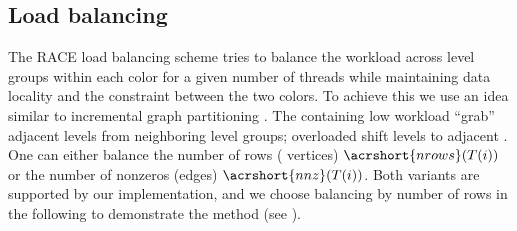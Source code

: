 \subsection{Load balancing}\label{subsec:LB} 
The RACE load balancing scheme tries to balance the workload across level
groups within each color for a given number of threads while maintaining data
locality and the \DK constraint between the two colors. To achieve this we use
an idea similar to incremental graph partitioning \cite{load_balancing}.  The
\levelGroups containing low workload ``grab'' adjacent levels from neighboring
level groups; overloaded \levelGroups shift levels to adjacent \levelGroups.
One can either balance the number of rows (\ie
vertices) $\acrshort{nrows}(T(i))$ or the number of
nonzeros (\ie edges)  $\acrshort{nnz}(T(i))$. Both variants
are supported by our implementation, and we choose balancing by number of
rows in the following to demonstrate the method (see
).
 
